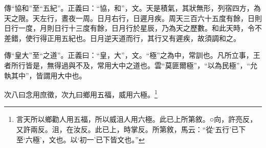 {\noindent\zhuan{}\fzbyks 傳“協和”至“五紀”。正義曰：“協，和”，文。天是積氣，其狀無形，列宿四方，為天之限。天左行，晝夜一周。日月右行，日遲月疾。周天三百六十五度有餘，日則日行一度，月則日行十三度有餘，日月行於星辰，乃為天之歷數。和此天時，令不差錯，使行得正用五紀也。日月逆天道而行，其行又有遲疾，故須調和之。 \par}

{\noindent\zhuan{}\fzbyks 傳“皇大”至“之道”。正義曰：“皇，大”，文。“極”之為中，常訓也。凡所立事，王者所行皆是，無得過與不及，常用大中之道也。雲“莫匪爾極”，“以為民極”，“允執其中”，皆謂用大中也。 \par}

次八曰念用庶徵，次九曰鄉用五福，威用六極。\footnote{言天所以鄉勸人用五福，所以威沮人用六極。此已上所第敘。○向，許亮反，又許兩反。沮，在汝反。此已上，時掌反。所第敘，馬云：“從‘五行’已下至‘六極’，文也。以‘初一’已下皆文也。”}

